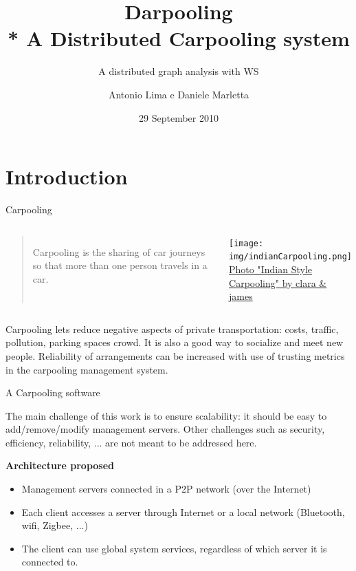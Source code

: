 \documentclass[mathserif]{beamer}
\title[Darpooling]
{Darpooling\\* A Distributed Carpooling system}
\subtitle{A distributed graph analysis with WS}
\author[A. Lima - D. Marletta]{Antonio Lima e Daniele Marletta}
\institute[UniCT]{
    Universit\`a degli Studi di Catania\\
        CdL in Ingegneria Informatica - Laurea Specialistica \\
        Corso di Sistemi Distribuiti
}
\date[29/09/2010]{29 September 2010}
\begin{document}
\begin{frame}[plain]
  \titlepage
\end{frame}
%

\section{Introduction}

\begin{frame}{Carpooling}  
\begin{columns}[c]
\begin{quote}
Carpooling is the sharing of car journeys so that more than one person travels in a car.

\end{quote}
\texttt{[image: img/indianCarpooling.png]} \\
\tiny{\href{http://www.flickr.com/photos/clara/2232510950/in/photostream/}{Photo "Indian Style Carpooling" by clara \& james}}
\end{columns}

\vfill

Carpooling lets reduce negative aspects of private transportation: costs,
traffic, pollution, parking spaces crowd. It is also a good way to socialize and meet new people.
Reliability of arrangements can be increased with use of trusting metrics
in the carpooling management system.
\end{frame}

\begin{frame}{A Carpooling software}

The main challenge of this work is to ensure scalability: 
it should be easy to add/remove/modify management servers. Other challenges
such as security, efficiency, reliability, ... are not meant to be
addressed here.
\vfill

\textbf{Architecture proposed}
\begin{itemize}
\item
Management servers connected in a P2P network (over the Internet)
\item
Each client accesses a server through Internet or a local network 
(Bluetooth, wifi, Zigbee, ...)
\item
The client can use global system services, regardless of which server it is
connected to.
\end{itemize}
\end{frame}
\end{document}
